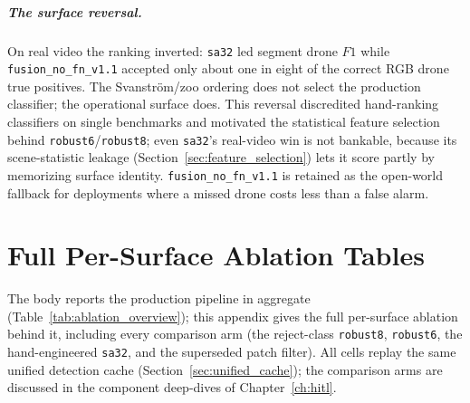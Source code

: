 \paragraph{The surface reversal.}
On real video the ranking inverted: \texttt{sa32} led segment drone $F1$ while \texttt{fusion\_no\_fn\_v1.1} accepted only about one in eight of the correct RGB drone true positives. The Svanstr\"om/zoo ordering does not select the production classifier; the operational surface does. This reversal discredited hand-ranking classifiers on single benchmarks and motivated the statistical feature selection behind \texttt{robust6}/\texttt{robust8}; even \texttt{sa32}'s real-video win is not bankable, because its scene-statistic leakage (Section~\ref{sec:feature_selection}) lets it score partly by memorizing surface identity. \texttt{fusion\_no\_fn\_v1.1} is retained as the open-world fallback for deployments where a missed drone costs less than a false alarm.

\chapter{Full Per-Surface Ablation Tables}
\label{app:full_ablation}

The body reports the production pipeline in aggregate (Table~\ref{tab:ablation_overview}); this appendix gives the full per-surface ablation behind it, including every comparison arm (the reject-class \texttt{robust8}, \texttt{robust6}, the hand-engineered \texttt{sa32}, and the superseded patch filter). All cells replay the same unified detection cache (Section~\ref{sec:unified_cache}); the comparison arms are discussed in the component deep-dives of Chapter~\ref{ch:hitl}.

